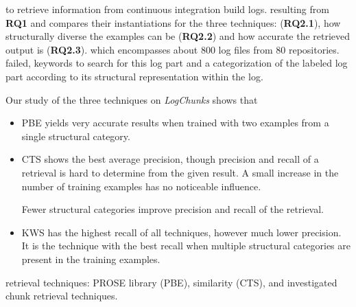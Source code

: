 to retrieve information from continuous integration build logs.
resulting from \textbf{RQ1} and compares their instantiations for the
three techniques:
(\textbf{RQ2.1}), how structurally diverse the examples can
be (\textbf{RQ2.2}) and how accurate the retrieved output is
(\textbf{RQ2.3}).
which encompasses about 800 log files from 80 repositories.
failed, keywords to search for this log part and a categorization of
the labeled log part according to its structural representation within
the log.

Our study of the three techniques on \emph{LogChunks} shows that
\begin{itemize}
  \item PBE yields very accurate results when trained with two examples
  from a
  single structural category.
  \item CTS shows the best average precision, though precision and recall
  of a
  retrieval is hard to determine from the given result.
  A small increase in the number of training examples has no noticeable
  influence.

  Fewer structural categories improve precision and recall of the
  retrieval.
  \item KWS has the highest recall of all techniques, however much
  lower precision.
  It is the technique with the best recall when multiple structural
  categories
  are present in the training examples.
\end{itemize}

retrieval techniques:
PROSE library (PBE),
similarity (CTS), and
investigated chunk retrieval techniques.

